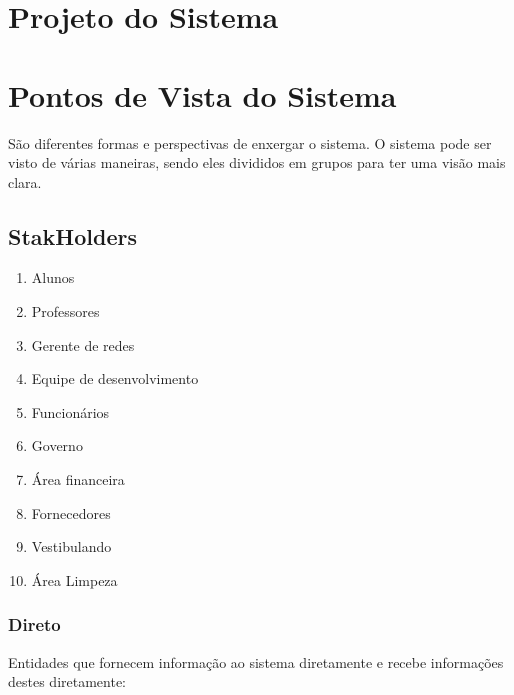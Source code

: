 

\chapter{Projeto do Sistema}

\chapter{Pontos de Vista do Sistema}

São diferentes formas e perspectivas de enxergar o sistema. O sistema pode ser visto de várias maneiras, sendo eles divididos em grupos para ter uma visão mais clara.

\section{StakHolders}

\begin{enumerate}
\item Alunos
\item Professores
\item Gerente de redes
\item Equipe de desenvolvimento
\item Funcionários
\item Governo
\item Área financeira
\item Fornecedores
\item Vestibulando 
\item Área Limpeza
\end{enumerate}

\subsection {Direto}

Entidades que fornecem informação ao sistema diretamente e recebe informações destes diretamente:

